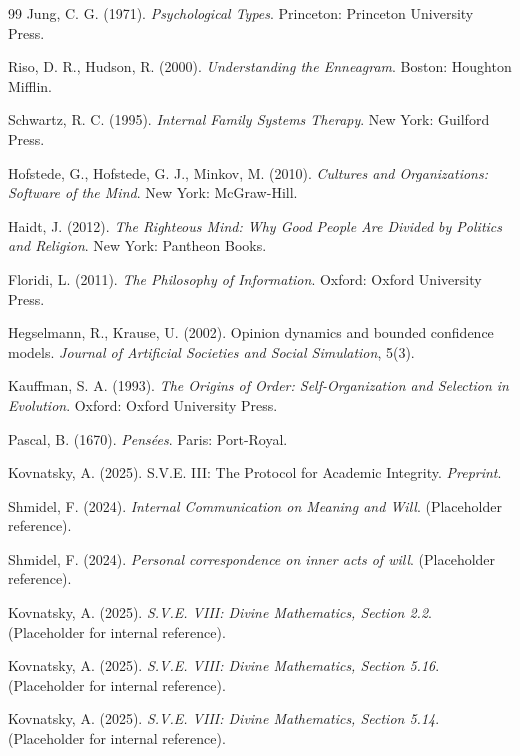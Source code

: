 \documentclass[11pt,a4paper]{article}
\theoremstyle{definition}
\theoremstyle{remark}
\begin{document}
\begin{small}
\begin{enumerate}
\begin{protocol}
\begin{thebibliography}{99}
Jung, C. G. (1971). \textit{Psychological Types}. Princeton: Princeton University Press.

Riso, D. R., Hudson, R. (2000). \textit{Understanding the Enneagram}. Boston: Houghton Mifflin.

Schwartz, R. C. (1995). \textit{Internal Family Systems Therapy}. New York: Guilford Press.

Hofstede, G., Hofstede, G. J., Minkov, M. (2010). \textit{Cultures and Organizations: Software of the Mind}. New York: McGraw-Hill.

Haidt, J. (2012). \textit{The Righteous Mind: Why Good People Are Divided by Politics and Religion}. New York: Pantheon Books.

Floridi, L. (2011). \textit{The Philosophy of Information}. Oxford: Oxford University Press.

Hegselmann, R., Krause, U. (2002). Opinion dynamics and bounded confidence models. \textit{Journal of Artificial Societies and Social Simulation}, 5(3).

Kauffman, S. A. (1993). \textit{The Origins of Order: Self-Organization and Selection in Evolution}. Oxford: Oxford University Press.

Pascal, B. (1670). \textit{Pensées}. Paris: Port-Royal.


Kovnatsky, A. (2025). S.V.E. III: The Protocol for Academic Integrity. \textit{Preprint}.

Shmidel, F. (2024). \textit{Internal Communication on Meaning and Will}. (Placeholder reference).

Shmidel, F. (2024). \textit{Personal correspondence on inner acts of will}. (Placeholder reference).

Kovnatsky, A. (2025). \textit{S.V.E. VIII: Divine Mathematics, Section 2.2}. (Placeholder for internal reference).

Kovnatsky, A. (2025). \textit{S.V.E. VIII: Divine Mathematics, Section 5.16}. (Placeholder for internal reference).

Kovnatsky, A. (2025). \textit{S.V.E. VIII: Divine Mathematics, Section 5.14}. (Placeholder for internal reference).


\end{thebibliography}
\end{protocol}
\end{enumerate}
\end{small}
\end{document}
